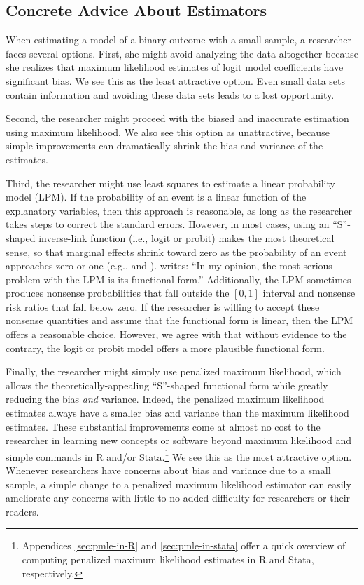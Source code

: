 \documentclass[12pt]{article}
\begin{document}
\subsection*{Concrete Advice About Estimators}

When estimating a model of a binary outcome with a small sample, a researcher faces several options. 
First, she might avoid analyzing the data altogether because she realizes that maximum likelihood estimates of logit model coefficients have significant bias.
We see this as the least attractive option.
Even small data sets contain information and avoiding these data sets leads to a lost opportunity.

Second, the researcher might proceed with the biased and inaccurate estimation using maximum likelihood.
We also see this option as unattractive, because simple improvements can dramatically shrink the bias and variance of the estimates.

Third, the researcher might use least squares to estimate a linear probability model (LPM). If the probability of an event is a linear function of the explanatory variables, then this approach is reasonable, as long as the researcher takes steps to correct the standard errors.
However, in most cases, using an ``S''-shaped inverse-link function (i.e., logit or probit) makes the most theoretical sense, so that marginal effects shrink toward zero as the probability of an event approaches zero or one (e.g.,
\citealt{BerryDeMerittEsarey2010} and \citealt[pp. 34-47]{Long1997}).
\citet[p. 40]{Long1997} writes: ``In my opinion, the most serious problem with the LPM is its functional form.''
Additionally, the LPM sometimes produces nonsense probabilities that fall outside the $[0, 1]$ interval and nonsense risk ratios that fall below zero.
If the researcher is willing to accept these nonsense quantities and assume that the functional form is linear, then the LPM offers a reasonable choice.
However, we agree with \cite{Long1997} that without evidence to the contrary, the logit or probit model offers a more plausible functional form.

Finally, the researcher might simply use penalized maximum likelihood, which allows the theoretically-appealing ``S''-shaped functional form while greatly reducing the bias \textit{and} variance.
Indeed, the penalized maximum likelihood estimates always have a smaller bias and variance than the maximum likelihood estimates.
These substantial improvements come at almost no cost to the researcher in learning new concepts or software beyond maximum likelihood and simple commands in R and/or Stata.\footnote{Appendices \ref{sec:pmle-in-R} and \ref{sec:pmle-in-stata} offer a quick overview of computing penalized maximum likelihood estimates in R and Stata, respectively.}
We see this as the most attractive option.
Whenever researchers have concerns about bias and variance due to a small sample, a simple change to a penalized maximum likelihood estimator can easily ameliorate any concerns with little to no added difficulty for researchers or their readers.
\end{document}
